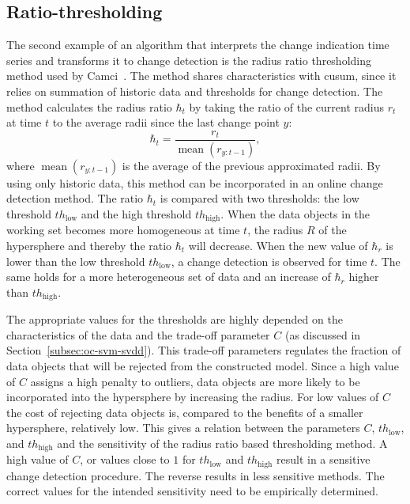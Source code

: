 \subsection{Ratio-thresholding}
The second example of an algorithm that interprets the change indication time series and transforms it to change detection is the radius ratio thresholding method used by Camci~\cite{camci2010change}.
The method shares characteristics with \gls{cusum}, since it relies on summation of historic data and thresholds for change detection.
The method calculates the radius ratio $\hbar_t$ by taking the ratio of the current radius $r_t$ at time $t$ to the average radii since the last change point $y$:
\begin{equation}\label{eq:ratio_radius}
  \hbar_t = \frac{r_t}{\operatorname*{mean}(r_{y:t-1})},
\end{equation}
where $\operatorname*{mean}(r_{y:t-1})$ is the average of the previous approximated radii.
By using only historic data, this method can be incorporated in an online change detection method.
The ratio $\hbar_t$ is compared with two thresholds: the low threshold $th_\text{low}$ and the high threshold $th_\text{high}$.
When the data objects in the working set becomes more homogeneous at time $t$, the radius $R$ of the hypersphere and thereby the ratio $\hbar_t$ will decrease.
When the new value of $\hbar_r$ is lower than the low threshold $th_\text{low}$, a change detection is observed for time $t$.
The same holds for a more heterogeneous set of data and an increase of $\hbar_r$ higher than $th_\text{high}$.

The appropriate values for the thresholds are highly depended on the characteristics of the data and the trade-off parameter $C$ (as discussed in Section~\ref{subsec:oc-svm-svdd}).
This trade-off parameters regulates the fraction of data objects that will be rejected from the constructed model.
Since a high value of $C$ assigns a high penalty to outliers, data objects are more likely to be incorporated into the hypersphere by increasing the radius.
For low values of $C$ the cost of rejecting data objects is, compared to the benefits of a smaller hypersphere, relatively low.
This gives a relation between the parameters $C$, $th_\text{low}$, and $th_\text{high}$ and the sensitivity of the radius ratio based thresholding method.
A high value of $C$, or values close to $1$ for $th_\text{low}$ and $th_\text{high}$ result in a sensitive change detection procedure.
The reverse results in less sensitive methods.
The correct values for the intended sensitivity need to be empirically determined.

